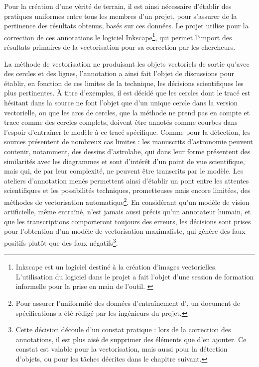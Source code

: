 	Pour la création d'une vérité de terrain, il est ainsi nécessaire d'établir des pratiques uniformes entre tous les membres d'un projet, pour s'assurer de la pertinence des résultats obtenus, basés sur ces données. Le projet \eida utilise pour la correction de ces annotations le logiciel Inkscape\footnote{Inkscape est un logiciel destiné à la création d'images vectorielles. L'utilisation du logiciel dans le projet \eida a fait l'objet d'une session de formation informelle pour la prise en main de l'outil. \cite{DessinerTouteLiberte}}, qui permet l'import des résultats primaires de la vectorisation pour sa correction par les chercheurs. 
	
	La méthode de vectorisation ne produisant les objets vectoriels de sortie qu'avec des cercles et des lignes, l'annotation a ainsi fait l'objet de discussions pour établir, en fonction de ces limites de la technique, les décisions scientifiques les plus pertinentes. À titre d'exemples, il est décidé que les cercles dont le tracé est hésitant dans la source ne font l'objet que d'un unique cercle dans la version vectorielle, ou que les arcs de cercles, que la méthode ne prend pas en compte et trace comme des cercles complets, doivent être annotés comme courbes dans l'espoir d'entraîner le modèle à ce tracé spécifique. Comme pour la détection, les sources présentent de nombreux cas limites : les manuscrits d'astronomie peuvent contenir, notamment, des dessins d'astrolabe, qui dans leur forme présentent des similarités avec les diagrammes et sont d'intérêt d'un point de vue scientifique, mais qui, de par leur complexité, ne peuvent être transcrits par le modèle. Les ateliers d'annotation menés permettent ainsi d'établir un pont entre les attentes scientifiques et les possibilités techniques, prometteuses mais encore limitées, des méthodes de vectorisation automatique\footnote{Pour assurer l'uniformité des données d'entraînement d'\eida, un document de spécifications a été rédigé par les ingénieurs du projet.}. En considérant qu'un modèle de vision artificielle, même entraîné, n'est jamais aussi précis qu'un annotateur humain, et que les transcriptions comporteront toujours des erreurs, les décisions sont prises pour l'obtention d'un modèle de vectorisation maximaliste, qui génère des faux positifs plutôt que des faux négatifs\footnote{Cette décision découle d'un constat pratique : lors de la correction des annotations, il est plus aisé de supprimer des éléments que d'en ajouter. Ce constat est valable pour la vectorisation, mais aussi pour la détection d'objets, ou pour les tâches décrites dans le chapitre suivant.}.

